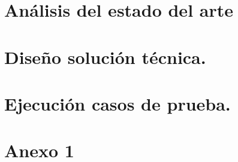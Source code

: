 \documentclass[12pt, a4paper]{book}
\begin{document}

\setmainfont{Carlito}
\frontmatter 


\tableofcontents	%
\listoffigures		%
\listoftables		%
\listofalgorithms   %
\listofcodes	    %
\cleardoublepage

\mainmatter
\pagestyle{fancy}



\chapter{Análisis del estado del arte}
 
 
\chapter{Diseño solución técnica.}


\chapter{Ejecución casos de prueba.}

\newpage

\appendix
\chapter{Anexo 1}
\lipsum[1-2]

\cleardoublepage
\thispagestyle{empty}

% 

 

\printglossaries
\end{document}
